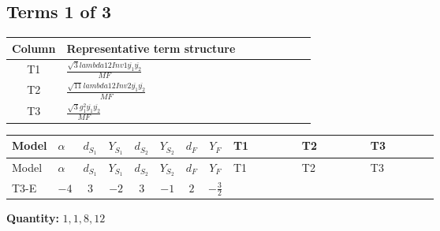 \documentclass[8pt]{article}
\begin{document}
\begin{landscape}
\subsection*{Terms 1 of 3}
\begin{center}
\begin{tabular}{@{}c >{\raggedright\arraybackslash}p{0.82\linewidth}@{}}
\toprule
Column & Representative term structure \\
\midrule
T1 & \(\displaystyle \frac{\sqrt{3} lambda12Inv1 \overline{y_{1}} \overline{y_{2}}}{MF}\) \\
\midrule
T2 & \(\displaystyle \frac{\sqrt{11} lambda12Inv2 \overline{y_{1}} \overline{y_{2}}}{MF}\) \\
\midrule
T3 & \(\displaystyle \frac{\sqrt{3} g_{1}^{2} \overline{y_{1}} \overline{y_{2}}}{MF}\) \\
\midrule
\bottomrule
\end{tabular}
\end{center}
\smallskip
\tiny
\begin{longtable}{@{}llcccccc >{\raggedright\arraybackslash}p{0.21\linewidth} >{\raggedright\arraybackslash}p{0.21\linewidth} >{\raggedright\arraybackslash}p{0.21\linewidth}@{}}
\toprule
Model & $\alpha$ & $d_{S_1}$ & $Y_{S_1}$ & $d_{S_2}$ & $Y_{S_2}$ & $d_F$ & $Y_F$ & T1 & T2 & T3 \\
\midrule
\endfirsthead
\toprule
Model & $\alpha$ & $d_{S_1}$ & $Y_{S_1}$ & $d_{S_2}$ & $Y_{S_2}$ & $d_F$ & $Y_F$ & T1 & T2 & T3 \\
\midrule
\endhead
T3-E & $-4$ & $3$ & $-2$ & $3$ & $-1$ & $2$ & $-\frac{3}{2}$ & \scriptsize\adjustbox{max width=\linewidth}{$\begin{gathered} - \frac{\sqrt{3} lambda12Inv1 \overline{y_{1}} \overline{y_{2}}}{6 MF}\end{gathered}$} & \scriptsize\adjustbox{max width=\linewidth}{$\begin{gathered} \frac{3 \sqrt{11} lambda12Inv2 \overline{y_{1}} \overline{y_{2}}}{22 MF}\end{gathered}$} & \scriptsize\adjustbox{max width=\linewidth}{$\begin{gathered} \frac{9 \sqrt{3} g_{1}^{2} \overline{y_{1}} \overline{y_{2}}}{8 MF}\end{gathered}$} \\
\midrule
\bottomrule
\end{longtable}
\clearpage
\noindent\textbf{Quantity: }$\mathrm{1,1,8,12}$\par\smallskip

\end{landscape}
\end{document}
